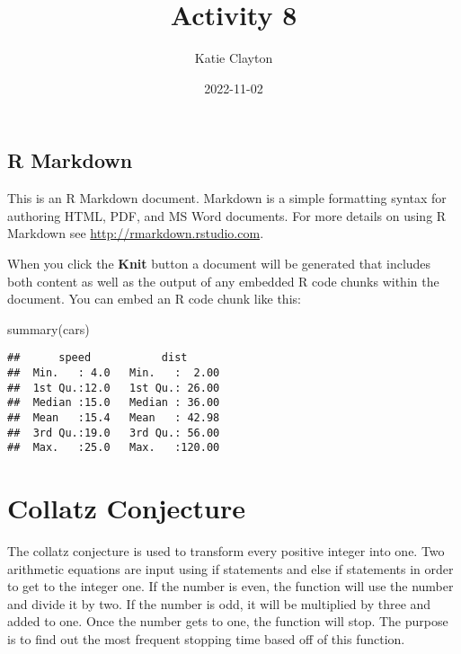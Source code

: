 \documentclass[
]{article}
\title{Activity 8}
\author{Katie Clayton}
\date{2022-11-02}
\newenvironment{Shaded}{\begin{snugshade}}{\end{snugshade}}
\newcommand{\FunctionTok}[1]{\textcolor[rgb]{0.00,0.00,0.00}{#1}}
\newcommand{\NormalTok}[1]{#1}
\begin{document}
\maketitle

\hypertarget{r-markdown}{%
\subsection{R Markdown}\label{r-markdown}}

This is an R Markdown document. Markdown is a simple formatting syntax
for authoring HTML, PDF, and MS Word documents. For more details on
using R Markdown see \url{http://rmarkdown.rstudio.com}.

When you click the \textbf{Knit} button a document will be generated
that includes both content as well as the output of any embedded R code
chunks within the document. You can embed an R code chunk like this:

\begin{Shaded}
\begin{Highlighting}[]
\FunctionTok{summary}\NormalTok{(cars)}
\end{Highlighting}
\end{Shaded}

\begin{verbatim}
##      speed           dist       
##  Min.   : 4.0   Min.   :  2.00  
##  1st Qu.:12.0   1st Qu.: 26.00  
##  Median :15.0   Median : 36.00  
##  Mean   :15.4   Mean   : 42.98  
##  3rd Qu.:19.0   3rd Qu.: 56.00  
##  Max.   :25.0   Max.   :120.00
\end{verbatim}

\hypertarget{collatz-conjecture}{%
\section{\texorpdfstring{\textbf{Collatz
Conjecture}}{Collatz Conjecture}}\label{collatz-conjecture}}

The collatz conjecture is used to transform every positive integer into
one. Two arithmetic equations are input using if statements and else if
statements in order to get to the integer one. If the number is even,
the function will use the number and divide it by two. If the number is
odd, it will be multiplied by three and added to one. Once the number
gets to one, the function will stop. The purpose is to find out the most
frequent stopping time based off of this function.
\end{document}
